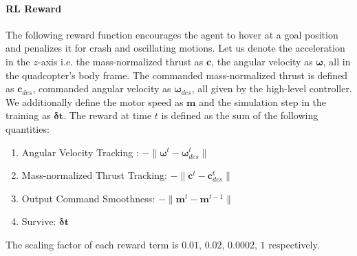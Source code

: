 \paragraph{RL Reward} The following reward function encourages the agent to hover at a goal position and penalizes it for crash and oscillating motions. Let us denote the acceleration in the $z$-axis i.e. the mass-normalized thrust as $\mathbf{c}$, the angular velocity as $\bm{\omega}$, all in the quadcopter's body frame. The commanded mass-normalized thrust is defined as $\bm{c}_{des}$, commanded angular velocity as $\bm{\omega}_{des}$, all given by the high-level controller.
We additionally define the motor speed as $\bm{m}$ and the simulation step in the training as $\bm{\delta t}$. The reward at time $t$ is defined as the sum of the following quantities:
\begin{enumerate}
    \item Angular Velocity Tracking : $-\| \bm{\omega}^{t} - \bm{\omega}_{des}^{t} \|$
    \item Mass-normalized Thrust Tracking: $-\| \mathbf{c}^{t} - \mathbf{c}_{des}^{t} \|$
    \item Output Command Smoothness: $-\| \bm{m}^{t} - \bm{m}^{t-1} \|$
    \item Survive: $\bm{\delta t}$
\end{enumerate}
The scaling factor of each reward term is $0.01$, $0.02$, $0.0002$, $1$ respectively. 

